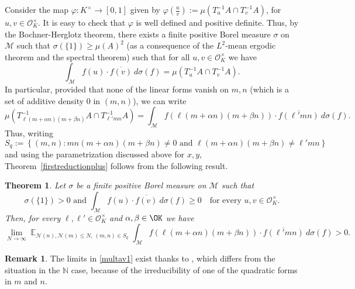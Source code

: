 \documentclass[11pt]{amsart}
\newtheorem{theorem}[lemma]{Theorem}
\theoremstyle{definition}
\newtheorem*{remark}{Remark}
\DeclareMathOperator*{\E}{\mathbb{E}}
\newcommand{\N}{{\mathbb N}}
\newcommand{\NN}{{\mathcal N}}
\begin{document}
Consider the map $\varphi: K^{\times} \to [0,1]$ given by $\varphi\left(\frac{u}{v}\right):=\mu(T_u^{-1}A \cap T_v^{-1}A)$, for $u, v \in \mathcal{O}_K^{\times}$. It is easy to check that $\varphi$ is well defined and positive definite. Thus, by the Bochner-Herglotz theorem, there exists a finite positive Borel measure $\sigma$ on $\mathcal{M}$ such that $\sigma(\{1\})\geq \mu(A)^2$ (as a consequence of the $L^2$-mean ergodic theorem and the spectral theorem) such that for all $u, v \in \mathcal{O}_K^{\times}$ we have
\[
\int_{\mathcal{M}} f(u) \cdot \overline{f(v)} \ d\sigma(f) = \mu(T_u^{-1}A \cap T_v^{-1}A). 
\]
In particular, provided that none of the linear forms vanish on $m,n$ (which is a set of additive density $0$ in $(m,n)$), we can write
\[
\mu(T_{\ell (m+\alpha n)(m+\beta n)}^{-1}A \cap T_{\ell' mn}^{-1}A) = \int_{\mathcal{M}} f(\ell (m+\alpha n)(m+\beta n)) \cdot \overline{f(\ell' mn)} \ d\sigma(f).
\]
Thus, writing $$S_q:=\left\{(m,n) : mn(m+\alpha n)(m+\beta n) \neq 0 \text{ and } \ell(m+\alpha n)(m+\beta n) \neq \ell'mn\right\}$$ and using the parametrization  discussed above for $x,y$, 
Theorem~\ref{firstreductionplus} follows from the following result.
\begin{theorem}\label{secondreduction}
Let $\sigma$ be a finite positive Borel measure on $\mathcal{M}$ such that 
\begin{equation}\label{positivitymeasures}
    \text{$\sigma(\{1\})>0$ and } \int_{\mathcal{M}} f(u)\cdot \overline{f(v)} \ d\sigma(f)\geq 0 \quad \text{for every } u, v \in \mathcal{O}_K^{\times}.
\end{equation}
Then, for every $\ell, \ell' \in \mathcal{O}_K^{\times}$ and $\alpha, \beta \in \OK$ we have
\begin{equation}\label{multav1}
    \lim_{N \to \infty} \E_{\NN(n),\NN(m) \leq N, \ (m,n) \in S_q}\int_{\mathcal{M}}  f(\ell (m+\alpha n)(m+\beta n)) \cdot \overline{f(\ell' mn)}\ d\sigma(f)>0.
\end{equation}
\end{theorem}
\begin{remark}
The limits in \eqref{multav1} exist thanks to \cite[Theorem~1.12]{S23}, which differs from the situation in the $\N$ case, because of the irreducibility of one of the quadratic forms in $m$ and $n$.
\end{remark}
\end{document}
